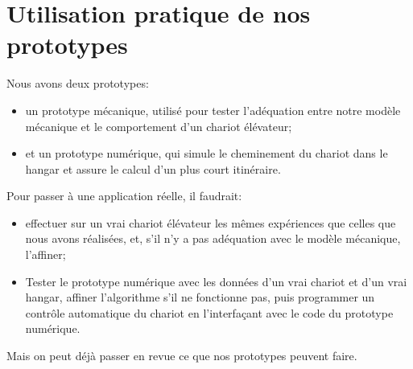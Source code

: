\section{Utilisation pratique de nos prototypes}
Nous avons deux prototypes:
\begin{itemize}
	\item un prototype mécanique, utilisé pour tester l'adéquation entre notre modèle mécanique et le comportement d'un chariot élévateur;
	\item et un prototype numérique, qui simule le cheminement du chariot dans le hangar et assure le calcul d'un plus court itinéraire.
\end{itemize}
Pour passer à une application réelle, il faudrait:
\begin{itemize}
	\item effectuer sur un vrai chariot élévateur les mêmes expériences que celles que nous avons réalisées, et, s'il n'y a pas adéquation avec le modèle mécanique, l'affiner;
	\item Tester le prototype numérique avec les données d'un vrai chariot et d'un vrai hangar, affiner l'algorithme s'il ne fonctionne pas, puis programmer un contrôle automatique du chariot en l'interfaçant avec le code du prototype numérique.\end{itemize}
Mais on peut déjà passer en revue ce que nos prototypes peuvent faire.
